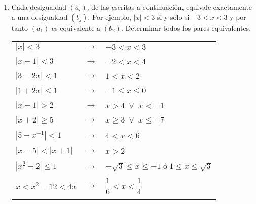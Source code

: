 \begin{enumerate}[ \bfseries 1.]
\item Cada desigualdad $(a_i)$, de las escritas a continuación, equivale exactamente a una desigualdad $(b_j)$. Por ejemplo, $|x|<3$ si y sólo si $-3<x<3$ y por tanto $(a_1)$ es equivalente a $(b_2)$. Determinar todos los pares equivalentes.\\
\begin{center}
\begin{tabular}{l c l}
$|x|<3$&$\longrightarrow$&$-3<x<3$\\\\
$|x-1|<3$&$\longrightarrow$&$-2<x<4$\\\\
$|3-2x|<1$&$\longrightarrow$&$1<x<2$\\\\
$|1+2x|\leq 1$&$\longrightarrow$&$-1\leq x \leq 0$\\\\
$|x-1|>2$&$\longrightarrow$&$x>4 \; \lor \; x<-1$\\\\
$|x+2| \geq 5$&$\longrightarrow$&$x\geq 3 \; \lor \; x\leq -7$\\\\
$|5-x^{-1}|<1 $&$\longrightarrow$&$4<x<6$\\\\
$|x-5|<|x+1|$&$\longrightarrow$&$x>2$\\\\
$|x^2-2|\leq 1$&$\longrightarrow$&$-\sqrt{3} \leq x \leq -1 \; ó \; 1\leq x \leq \sqrt{3}$\\\\
$x<x^2-12<4x$&$\longrightarrow$&$\dfrac{1}{6}<x<\dfrac{1}{4}$\\\\
\end{tabular}
\end{center}


\end{enumerate}

